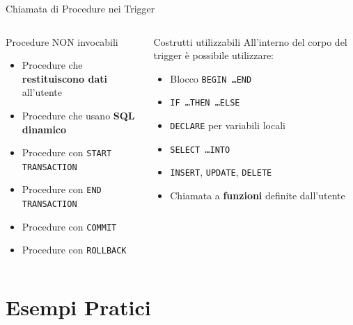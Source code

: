 \documentclass[aspectratio=169]{beamer}
\begin{document}
\begin{frame}{Chiamata di Procedure nei Trigger}
  \begin{columns}[T]
      \begin{alertblock}{Procedure NON invocabili}
        \begin{itemize}
          \item Procedure che \textbf{restituiscono dati} all'utente
          \item Procedure che usano \textbf{SQL dinamico}
          \item Procedure con \texttt{START TRANSACTION}
          \item Procedure con \texttt{END TRANSACTION}
          \item Procedure con \texttt{COMMIT}
          \item Procedure con \texttt{ROLLBACK}
        \end{itemize}
      \end{alertblock}
      \begin{exampleblock}{Costrutti utilizzabili}
        All'interno del corpo del trigger è possibile utilizzare:
        \begin{itemize}
          \item Blocco \texttt{BEGIN \ldots END}
          \item \texttt{IF \ldots THEN \ldots ELSE}
          \item \texttt{DECLARE} per variabili locali
          \item \texttt{SELECT \ldots INTO}
          \item \texttt{INSERT}, \texttt{UPDATE}, \texttt{DELETE}
          \item Chiamata a \textbf{funzioni} definite dall'utente
        \end{itemize}
      \end{exampleblock}
  \end{columns}
\end{frame}

\section{Esempi Pratici}
\end{document}
